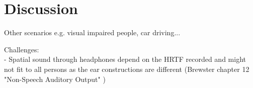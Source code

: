 \chapter{Discussion}
Other scenarios e.g. visual impaired people, car driving...

Challenges:\\
- Spatial sound through headphones depend on the HRTF recorded and might not fit to all persons as the ear constructions are different (Brewster chapter 12 "Non-Speech Auditory Output" \cite{brewster_human-computer_2003})